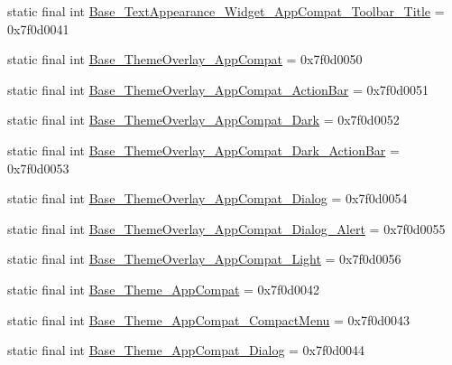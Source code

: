 \begin{DoxyCompactItemize}
\item 
static final int \mbox{\hyperlink{classandroid_1_1support_1_1v7_1_1appcompat_1_1R_1_1style_afc0aa5f87799755400758b40a2ea23b1}{Base\+\_\+\+Text\+Appearance\+\_\+\+Widget\+\_\+\+App\+Compat\+\_\+\+Toolbar\+\_\+\+Title}} = 0x7f0d0041
\item 
static final int \mbox{\hyperlink{classandroid_1_1support_1_1v7_1_1appcompat_1_1R_1_1style_ae4b85b193267b846c5a1c56dad179d1c}{Base\+\_\+\+Theme\+Overlay\+\_\+\+App\+Compat}} = 0x7f0d0050
\item 
static final int \mbox{\hyperlink{classandroid_1_1support_1_1v7_1_1appcompat_1_1R_1_1style_a65e1bb81ae73752bcc8d4bf7e97a14dd}{Base\+\_\+\+Theme\+Overlay\+\_\+\+App\+Compat\+\_\+\+Action\+Bar}} = 0x7f0d0051
\item 
static final int \mbox{\hyperlink{classandroid_1_1support_1_1v7_1_1appcompat_1_1R_1_1style_a3e8cd9266f191c0fc16f3473f8891e6a}{Base\+\_\+\+Theme\+Overlay\+\_\+\+App\+Compat\+\_\+\+Dark}} = 0x7f0d0052
\item 
static final int \mbox{\hyperlink{classandroid_1_1support_1_1v7_1_1appcompat_1_1R_1_1style_a24212e31d5a8f471486aaef0c26a2345}{Base\+\_\+\+Theme\+Overlay\+\_\+\+App\+Compat\+\_\+\+Dark\+\_\+\+Action\+Bar}} = 0x7f0d0053
\item 
static final int \mbox{\hyperlink{classandroid_1_1support_1_1v7_1_1appcompat_1_1R_1_1style_a1a7a7bde0fa3523d7d498c9b59212d70}{Base\+\_\+\+Theme\+Overlay\+\_\+\+App\+Compat\+\_\+\+Dialog}} = 0x7f0d0054
\item 
static final int \mbox{\hyperlink{classandroid_1_1support_1_1v7_1_1appcompat_1_1R_1_1style_ad2c801d2143d2c12fd0d6159046b38a2}{Base\+\_\+\+Theme\+Overlay\+\_\+\+App\+Compat\+\_\+\+Dialog\+\_\+\+Alert}} = 0x7f0d0055
\item 
static final int \mbox{\hyperlink{classandroid_1_1support_1_1v7_1_1appcompat_1_1R_1_1style_ad811f28779abf2944bb85a604e57c055}{Base\+\_\+\+Theme\+Overlay\+\_\+\+App\+Compat\+\_\+\+Light}} = 0x7f0d0056
\item 
static final int \mbox{\hyperlink{classandroid_1_1support_1_1v7_1_1appcompat_1_1R_1_1style_a8e435bd44b683737594e2074394d738e}{Base\+\_\+\+Theme\+\_\+\+App\+Compat}} = 0x7f0d0042
\item 
static final int \mbox{\hyperlink{classandroid_1_1support_1_1v7_1_1appcompat_1_1R_1_1style_a0c56917b296881cef762400b9c529cd6}{Base\+\_\+\+Theme\+\_\+\+App\+Compat\+\_\+\+Compact\+Menu}} = 0x7f0d0043
\item 
static final int \mbox{\hyperlink{classandroid_1_1support_1_1v7_1_1appcompat_1_1R_1_1style_a38182a25356e4f9666256f98e5ca7125}{Base\+\_\+\+Theme\+\_\+\+App\+Compat\+\_\+\+Dialog}} = 0x7f0d0044

\end{DoxyCompactItemize}
